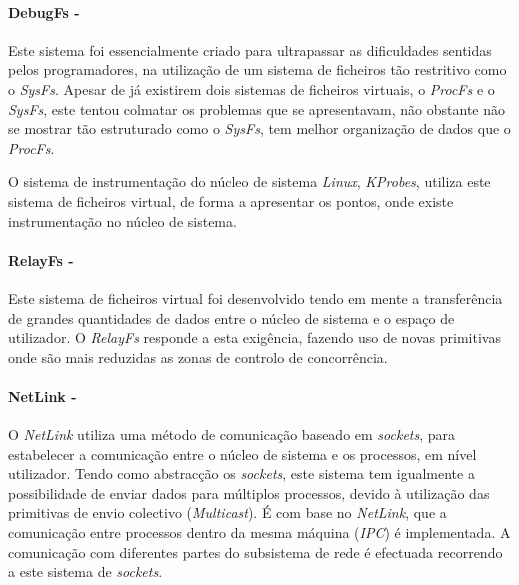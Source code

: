 \paragraph*{DebugFs - }\label{cap:DebugFs_overview}

Este sistema foi essencialmente criado para ultrapassar as dificuldades sentidas pelos programadores, na utilização de um sistema de ficheiros tão restritivo como o \textit{SysFs}.
Apesar de já existirem dois sistemas de ficheiros virtuais, o \textit{ProcFs} e o \textit{SysFs}, este tentou colmatar os problemas que se apresentavam, não obstante não se mostrar tão estruturado como o \textit{SysFs}, tem melhor organização de dados que o \textit{ProcFs}.

O sistema de instrumentação do núcleo de sistema \textit{Linux}, \textit{KProbes}, utiliza este sistema de ficheiros virtual, de forma a apresentar os pontos, onde existe instrumentação no núcleo de sistema.

\paragraph*{RelayFs - }\label{cap:RelayFs_overview}

Este sistema de ficheiros virtual foi desenvolvido tendo em mente a transferência de grandes quantidades de dados entre o núcleo de sistema e o espaço de utilizador.
O \textit{RelayFs} responde a esta exigência, fazendo uso de novas primitivas onde são mais reduzidas as zonas de controlo de concorrência\cite{Donovan2007,To03relayfs:an}.

\paragraph*{NetLink - }\label{cap:NetLink_overview}
O \textit{NetLink} utiliza uma método de comunicação baseado em \textit{sockets}, para estabelecer a comunicação entre o núcleo de sistema e os processos, em nível utilizador. 
 Tendo como abstracção os \textit{sockets}, este sistema tem igualmente a possibilidade de enviar dados para múltiplos processos, devido à utilização das primitivas de envio colectivo (\textit{Multicast}).
 É com base no \textit{NetLink}, que a comunicação entre processos dentro da mesma máquina (\textit{IPC}) é implementada.
 A comunicação com diferentes partes do subsistema de rede é efectuada recorrendo a este sistema de \textit{sockets}.


